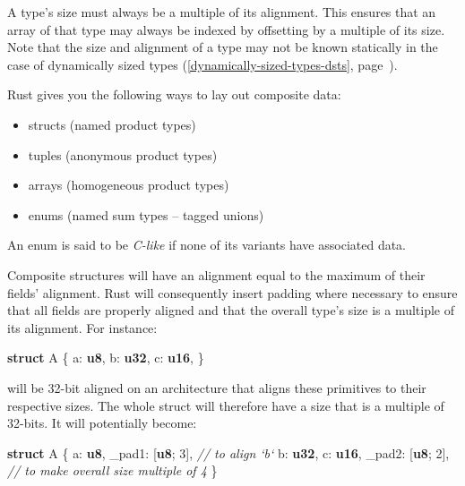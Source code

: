 \documentclass[a4paper,]{book}
\renewcommand*{\hyperref}[2][\ar]{%
  \def\ar{#2}%
  #2 (\autoref{#1}, page~\pageref{#1})}
\newenvironment{Shaded}{\begin{snugshade}}{\end{snugshade}}
\newcommand{\KeywordTok}[1]{\textcolor[rgb]{0.13,0.29,0.53}{\textbf{{#1}}}}
\newcommand{\DecValTok}[1]{\textcolor[rgb]{0.00,0.00,0.81}{{#1}}}
\newcommand{\CommentTok}[1]{\textcolor[rgb]{0.56,0.35,0.01}{\textit{{#1}}}}
\newcommand{\NormalTok}[1]{{#1}}
\begin{document}
A type's size must always be a multiple of its alignment. This ensures
that an array of that type may always be indexed by offsetting by a
multiple of its size. Note that the size and alignment of a type may not
be known statically in the case of
\hyperref[dynamically-sized-types-dsts]{dynamically sized types}.

Rust gives you the following ways to lay out composite data:

\begin{itemize}
\itemsep1pt\parskip0pt
\item
  structs (named product types)
\item
  tuples (anonymous product types)
\item
  arrays (homogeneous product types)
\item
  enums (named sum types -- tagged unions)
\end{itemize}

An enum is said to be \emph{C-like} if none of its variants have
associated data.

Composite structures will have an alignment equal to the maximum of
their fields' alignment. Rust will consequently insert padding where
necessary to ensure that all fields are properly aligned and that the
overall type's size is a multiple of its alignment. For instance:

\begin{Shaded}
\begin{Highlighting}[]
\KeywordTok{struct} \NormalTok{A \{}
    \NormalTok{a: }\KeywordTok{u8}\NormalTok{,}
    \NormalTok{b: }\KeywordTok{u32}\NormalTok{,}
    \NormalTok{c: }\KeywordTok{u16}\NormalTok{,}
\NormalTok{\}}
\end{Highlighting}
\end{Shaded}

will be 32-bit aligned on an architecture that aligns these primitives
to their respective sizes. The whole struct will therefore have a size
that is a multiple of 32-bits. It will potentially become:

\begin{Shaded}
\begin{Highlighting}[]
\KeywordTok{struct} \NormalTok{A \{}
    \NormalTok{a: }\KeywordTok{u8}\NormalTok{,}
    \NormalTok{_pad1: [}\KeywordTok{u8}\NormalTok{; }\DecValTok{3}\NormalTok{], }\CommentTok{// to align `b`}
    \NormalTok{b: }\KeywordTok{u32}\NormalTok{,}
    \NormalTok{c: }\KeywordTok{u16}\NormalTok{,}
    \NormalTok{_pad2: [}\KeywordTok{u8}\NormalTok{; }\DecValTok{2}\NormalTok{], }\CommentTok{// to make overall size multiple of 4}
\NormalTok{\}}
\end{Highlighting}
\end{Shaded}
\end{document}
